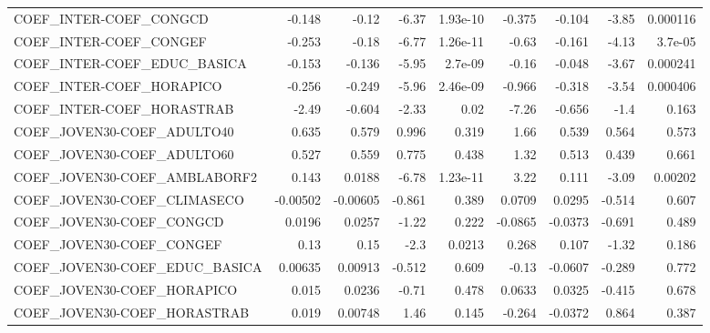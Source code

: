 \begin{tabular}{lrrrrrrrr}
COEF\_INTER-COEF\_CONGCD                &      -0.148 &        -0.12 &    -6.37 & 1.93e-10 &     -0.375 &      -0.104 &        -3.85 &      0.000116 \\
COEF\_INTER-COEF\_CONGEF                &      -0.253 &        -0.18 &    -6.77 & 1.26e-11 &      -0.63 &      -0.161 &        -4.13 &       3.7e-05 \\
COEF\_INTER-COEF\_EDUC\_BASICA           &      -0.153 &       -0.136 &    -5.95 &  2.7e-09 &      -0.16 &      -0.048 &        -3.67 &      0.000241 \\
COEF\_INTER-COEF\_HORAPICO              &      -0.256 &       -0.249 &    -5.96 & 2.46e-09 &     -0.966 &      -0.318 &        -3.54 &      0.000406 \\
COEF\_INTER-COEF\_HORASTRAB             &       -2.49 &       -0.604 &    -2.33 &     0.02 &      -7.26 &      -0.656 &         -1.4 &         0.163 \\
COEF\_JOVEN30-COEF\_ADULTO40            &       0.635 &        0.579 &    0.996 &    0.319 &       1.66 &       0.539 &        0.564 &         0.573 \\
COEF\_JOVEN30-COEF\_ADULTO60            &       0.527 &        0.559 &    0.775 &    0.438 &       1.32 &       0.513 &        0.439 &         0.661 \\
COEF\_JOVEN30-COEF\_AMBLABORF2          &       0.143 &       0.0188 &    -6.78 & 1.23e-11 &       3.22 &       0.111 &        -3.09 &       0.00202 \\
COEF\_JOVEN30-COEF\_CLIMASECO           &    -0.00502 &     -0.00605 &   -0.861 &    0.389 &     0.0709 &      0.0295 &       -0.514 &         0.607 \\
COEF\_JOVEN30-COEF\_CONGCD              &      0.0196 &       0.0257 &    -1.22 &    0.222 &    -0.0865 &     -0.0373 &       -0.691 &         0.489 \\
COEF\_JOVEN30-COEF\_CONGEF              &        0.13 &         0.15 &     -2.3 &   0.0213 &      0.268 &       0.107 &        -1.32 &         0.186 \\
COEF\_JOVEN30-COEF\_EDUC\_BASICA         &     0.00635 &      0.00913 &   -0.512 &    0.609 &      -0.13 &     -0.0607 &       -0.289 &         0.772 \\
COEF\_JOVEN30-COEF\_HORAPICO            &       0.015 &       0.0236 &    -0.71 &    0.478 &     0.0633 &      0.0325 &       -0.415 &         0.678 \\
COEF\_JOVEN30-COEF\_HORASTRAB           &       0.019 &      0.00748 &     1.46 &    0.145 &     -0.264 &     -0.0372 &        0.864 &         0.387 \\

\end{tabular}
